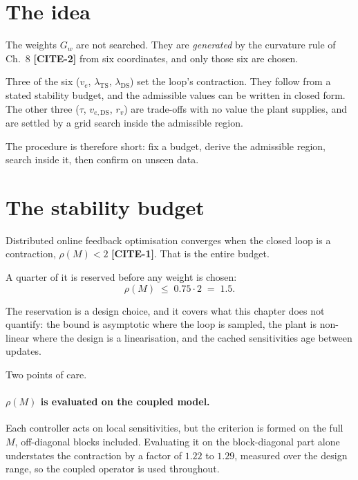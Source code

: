 \documentclass[11pt,a4paper]{article}
\newcommand{\lamts}{\ensuremath{\lambda_{\mathrm{TS}}}}
\newcommand{\lamds}{\ensuremath{\lambda_{\mathrm{DS}}}}
\newcommand{\CITE}[1]{\textbf{[CITE-#1]}}
\begin{document}
\section{The idea}
\label{sec:wsel:idea}

The weights $G_w$ are not searched. They are \emph{generated} by the curvature
rule of Ch.~8 \CITE{2} from six coordinates, and only those six are chosen.

Three of the six ($v_e$, \lamts, \lamds) set the loop's contraction. They follow
from a stated stability budget, and the admissible values can be written in
closed form. The other three ($\tau$, $v_{e,\mathrm{DS}}$, $r_v$) are trade-offs
with no value the plant supplies, and are settled by a grid search inside the
admissible region.

The procedure is therefore short: fix a budget, derive the admissible region,
search inside it, then confirm on unseen data.

\section{The stability budget}
\label{sec:wsel:budget}

Distributed online feedback optimisation converges when the closed loop is a
contraction, $\rho(M) < 2$ \CITE{1}. That is the entire budget.

A quarter of it is reserved before any weight is chosen:
\begin{equation}
  \label{eq:wsel:budget}
  \rho(M) \;\leq\; 0.75 \cdot 2 \;=\; 1.5 .
\end{equation}

The reservation is a design choice, and it covers what this chapter does not
quantify: the bound is asymptotic where the loop is sampled, the plant is
non-linear where the design is a linearisation, and the cached sensitivities age
between updates.

Two points of care.

\paragraph{$\rho(M)$ is evaluated on the coupled model.}
Each controller acts on local sensitivities, but the criterion is formed on the
full $M$, off-diagonal blocks included. Evaluating it on the block-diagonal part
alone understates the contraction by a factor of $1.22$ to $1.29$, measured over
the design range, so the coupled operator is used throughout.
\end{document}
